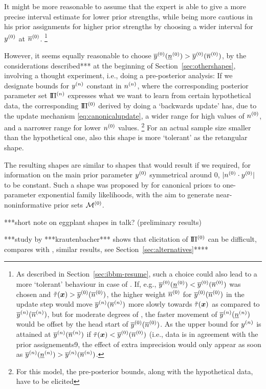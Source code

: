 It might be more reasonable to assume that the expert is able to give
a more precise interval estimate for lower prior strengths,
while being more cautious in his prior assignments for higher prior strengths
by choosing a wider interval for $y^{(0)}$ at $\overline{n}^{(0)}$.%
\footnote{As described in Section~\ref{sec:ibbm-resume},
such a choice could also lead to a more `tolerant' behaviour in case of \pdc.
If, e.g., $\overline{y}^{(0)}(\underline{n}^{(0)}) < \overline{y}^{(0)}(\overline{n}^{(0)})$ was chosen and $\tilde{\tau}({\bm x}) > \overline{y}^{(0)}(\overline{n}^{(0)})$,
the higher weight $\overline{n}^{(0)}$ for $\overline{y}^{(0)}(\overline{n}^{(0)})$ in the update step
would move $\overline{y}^{(n)}(\overline{n}^{(n)})$ more slowly towards $\tilde{\tau}({\bm x})$ as compared to $\overline{y}^{(n)}(\overline{n}^{(n)})$,
but for moderate degrees of \pdc, the faster movement of $\overline{y}^{(n)}(\underline{n}^{(n)})$
would be offset by the head start of $\overline{y}^{(0)}(\overline{n}^{(0)})$.
As the upper bound for $y^{(n)}$ is attained at $\overline{y}^{(n)}(\overline{n}^{(n)})$
if $\tilde{\tau}({\bm x}) < \overline{y}^{(0)}(\overline{n}^{(0)})$ (i.e., data is in agreement with the prior assignements9,
the effect of extra imprecision would only appear as soon as $\overline{y}^{(n)}(\underline{n}^{(n)}) > \overline{y}^{(n)}(\overline{n}^{(n)})$.}

However, it seems equally reasonable to choose $\overline{y}^{(0)}(\underline{n}^{(0)}) > \overline{y}^{(0)}(\overline{n}^{(0)})$,
by the considerations described*** at the beginning of Section~\ref{sec:othershapes},
involving a thought experiment, i.e., doing a pre-posterior analysis:
If we designate bounds for $y^{(n)}$ constant in $n^{(n)}$,
where the corresponding posterior parameter set $\text{I}\!\Pi^{(n)}$
expresses what we want to learn from certain hypothetical data,
the corresponding $\text{I}\!\Pi^{(0)}$ derived by doing a `backwards update' has,
due to the update mechanism \eqref{eq:canonicalupdate},
a wider range for high values of $n^{(0)}$, and a narrower range for lower $n^{(0)}$ values.%
\footnote{For this model, the pre-posterior bounds, along with the hypothetical data, have to be elicited}
For an actual sample size smaller than the hypothetical one,
also this shape is more `tolerant' as the retangular shape.

The resulting shapes are similar to shapes that would result
if we required, for information on the main prior parameter $y^{(0)}$ symmetrical around $0$,
$|n^{(0)} \cdot y^{(0)}|$ to be constant.
Such a shape was proposed by \textcite{2012:benavolizaffalon}
for canonical priors to one-parameter exponential family likelihoods,
with the aim to generate near-noninformative prior sets $\mathcal{M}^{(0)}$.



***short note on eggplant shapes in talk? (preliminary results)


***study by ***krautenbacher*** shows that elicitation of $\text{I}\!\Pi^{(0)}$ can be difficult,
compares with \textcite{2005:whitcomb}, similar results, see Section~\ref{sec:alternatives}****

